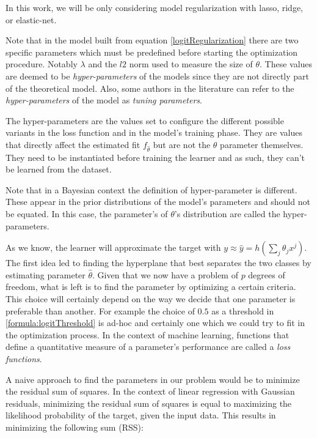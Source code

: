 In this work, we will be only considering model regularization with lasso, ridge, or elastic-net.

Note that in the model built from equation \ref{logitRegularization} there are two specific parameters which must be predefined before starting the optimization procedure. Notably  $\lambda$ and the $l2$ norm used to measure the size of $\theta$. These values are deemed to be \textit{hyper-parameters} of the models since they are not directly part of the theoretical model. Also, some authors in the literature can refer to the \textit{hyper-parameters} of the model as \textit{tuning parameters}.

The hyper-parameters are the values set to configure the different possible variants in the loss function and in the model's training phase.  They are values that directly affect the estimated fit $f_{\hat{\theta}}$ but are not the $\theta$ parameter themselves.  They need to be instantiated before training the learner and as such, they can't be learned from the dataset.

Note that in a Bayesian context the definition of hyper-parameter is different. These appear in the  prior distributions of the model's parameters and should not be equated. In this case, the parameter's of $\theta$'s distribution are called the hyper-parameters.


\textit{}


As we know, the learner will approximate the target with $y \approx \hat{y} = h\left(\sum_{j}\theta_j x^j\right)$. The first idea led to finding the hyperplane that best separates the two classes by estimating parameter $\hat{\theta}$. Given that we now have a problem of $p$ degrees of freedom, what is left is to find the parameter by optimizing a certain criteria. This choice will certainly depend on the way we decide that one parameter is preferable than another. For example the choice of $0.5$ as a threshold in \ref{formula:logitThreshold} is ad-hoc and certainly one which we could try to fit in the optimization process. In the context of machine learning, functions that define a quantitative measure of a parameter's performance  are called a \textit{loss functions}.

A naive approach to find the parameters in our problem would be to minimize the residual sum of squares. In the context of linear regression with Gaussian residuals, minimizing the residual sum of squares is equal to maximizing the likelihood probability of the target, given the input data. This results in minimizing the following sum (RSS):

